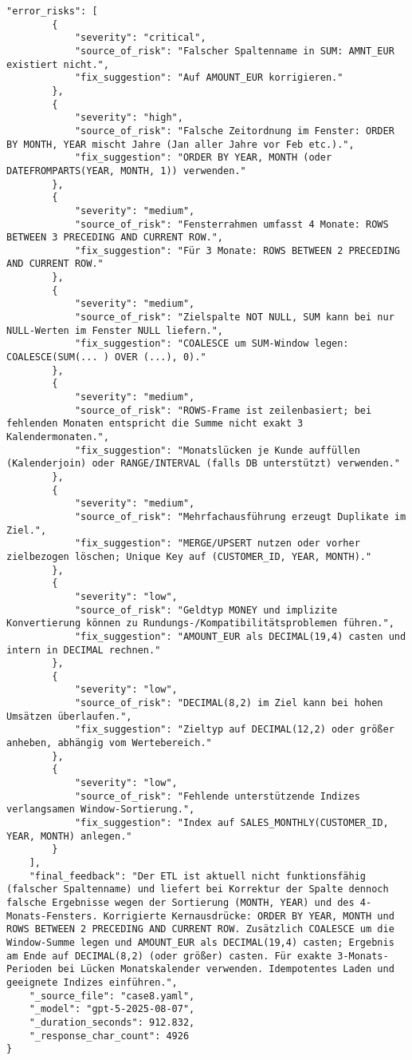 \begin{lstlisting}[caption={Ausgabe: GPT-5 Anwendungsfall 8 Hauptdurchlauf},label={gpt_case8_prompt1}]
    "error_risks": [
        {
            "severity": "critical",
            "source_of_risk": "Falscher Spaltenname in SUM: AMNT_EUR existiert nicht.",
            "fix_suggestion": "Auf AMOUNT_EUR korrigieren."
        },
        {
            "severity": "high",
            "source_of_risk": "Falsche Zeitordnung im Fenster: ORDER BY MONTH, YEAR mischt Jahre (Jan aller Jahre vor Feb etc.).",
            "fix_suggestion": "ORDER BY YEAR, MONTH (oder DATEFROMPARTS(YEAR, MONTH, 1)) verwenden."
        },
        {
            "severity": "medium",
            "source_of_risk": "Fensterrahmen umfasst 4 Monate: ROWS BETWEEN 3 PRECEDING AND CURRENT ROW.",
            "fix_suggestion": "Für 3 Monate: ROWS BETWEEN 2 PRECEDING AND CURRENT ROW."
        },
        {
            "severity": "medium",
            "source_of_risk": "Zielspalte NOT NULL, SUM kann bei nur NULL-Werten im Fenster NULL liefern.",
            "fix_suggestion": "COALESCE um SUM-Window legen: COALESCE(SUM(... ) OVER (...), 0)."
        },
        {
            "severity": "medium",
            "source_of_risk": "ROWS-Frame ist zeilenbasiert; bei fehlenden Monaten entspricht die Summe nicht exakt 3 Kalendermonaten.",
            "fix_suggestion": "Monatslücken je Kunde auffüllen (Kalenderjoin) oder RANGE/INTERVAL (falls DB unterstützt) verwenden."
        },
        {
            "severity": "medium",
            "source_of_risk": "Mehrfachausführung erzeugt Duplikate im Ziel.",
            "fix_suggestion": "MERGE/UPSERT nutzen oder vorher zielbezogen löschen; Unique Key auf (CUSTOMER_ID, YEAR, MONTH)."
        },
        {
            "severity": "low",
            "source_of_risk": "Geldtyp MONEY und implizite Konvertierung können zu Rundungs-/Kompatibilitätsproblemen führen.",
            "fix_suggestion": "AMOUNT_EUR als DECIMAL(19,4) casten und intern in DECIMAL rechnen."
        },
        {
            "severity": "low",
            "source_of_risk": "DECIMAL(8,2) im Ziel kann bei hohen Umsätzen überlaufen.",
            "fix_suggestion": "Zieltyp auf DECIMAL(12,2) oder größer anheben, abhängig vom Wertebereich."
        },
        {
            "severity": "low",
            "source_of_risk": "Fehlende unterstützende Indizes verlangsamen Window-Sortierung.",
            "fix_suggestion": "Index auf SALES_MONTHLY(CUSTOMER_ID, YEAR, MONTH) anlegen."
        }
    ],
    "final_feedback": "Der ETL ist aktuell nicht funktionsfähig (falscher Spaltenname) und liefert bei Korrektur der Spalte dennoch falsche Ergebnisse wegen der Sortierung (MONTH, YEAR) und des 4-Monats-Fensters. Korrigierte Kernausdrücke: ORDER BY YEAR, MONTH und ROWS BETWEEN 2 PRECEDING AND CURRENT ROW. Zusätzlich COALESCE um die Window-Summe legen und AMOUNT_EUR als DECIMAL(19,4) casten; Ergebnis am Ende auf DECIMAL(8,2) (oder größer) casten. Für exakte 3-Monats-Perioden bei Lücken Monatskalender verwenden. Idempotentes Laden und geeignete Indizes einführen.",
    "_source_file": "case8.yaml",
    "_model": "gpt-5-2025-08-07",
    "_duration_seconds": 912.832,
    "_response_char_count": 4926
}
\end{lstlisting}

